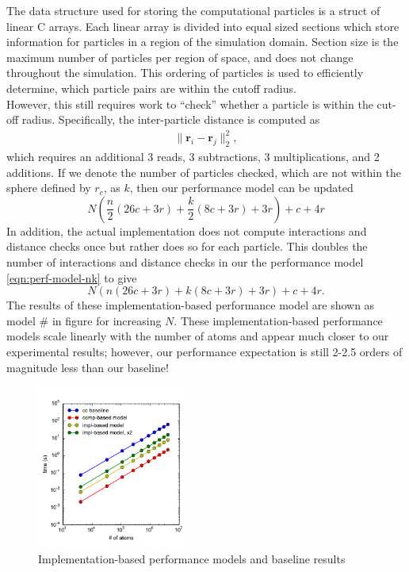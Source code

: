 \documentclass[12pt]{article}
\begin{document}
\noindent The data structure used for storing the computational particles is a
struct of linear C arrays. Each linear array is divided into equal sized sections which 
store information for particles in a region of the simulation domain. 
Section size is the maximum number of particles per region of space, 
and does not change throughout the simulation. 
This ordering of particles is used to efficiently determine, which particle pairs are within 
the cutoff radius. \\

\noindent However, this still requires work to ``check'' whether a particle 
is within the cut-off radius. Specifically, the inter-particle distance is computed as
\begin{align*}
    \| \bm{r}_i - \bm{r}_j\|_2^2,
\end{align*}
which requires an additional 3 reads, 3 subtractions, 3 multiplications, and 2 additions.
If we denote the number of particles checked, which are not within the sphere defined 
by $r_c$, as $k$, then our performance model can be updated
\begin{equation}
  N \left(\frac{n}{2} \left(26 c + 3 r\right)+\frac{k}{2} \left(8 c + 3 r\right) + 3 r\right) + c + 4 r
  \label{eqn:perf-model-nk}
\end{equation}
In addition, the actual implementation does not compute interactions and distance
checks once but rather does so for each particle. This doubles the number of interactions 
and distance checks in our the performance model \ref{eqn:perf-model-nk} to give
\begin{equation}
  N \left(n \left(26 c + 3 r\right)+k \left(8 c + 3 r\right) + 3 r\right) + c + 4 r.
  \label{eqn:perf-model-2n2k}
\end{equation}
The results of these implementation-based performance model are shown as model \# in figure 
for increasing $N$. These implementation-based performance models 
scale linearly with the number of atoms and appear much closer to our experimental results; however,
our performance expectation is still 2-2.5 orders of magnitude less than our baseline!

\begin{figure}[h!]
  \centering
  \includegraphics[width=0.45\textwidth]{../figs/implmodel_forceLJ.pdf}
  \caption{Implementation-based performance models and baseline results}
\end{figure}
\end{document}
